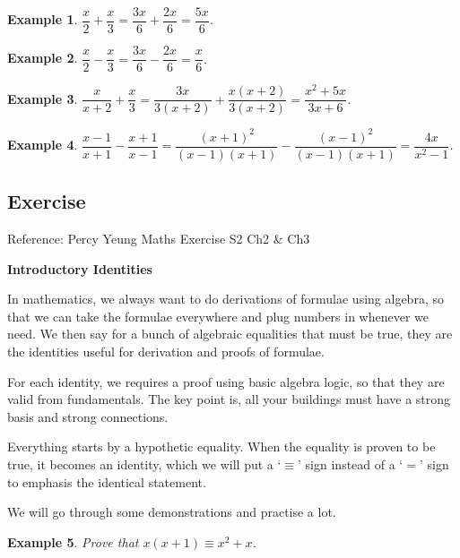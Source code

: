 \documentclass[12pt]{article}
\newtheorem{example}{Example}
\begin{document}
    \begin{example}
        $\dfrac{x}{2}+\dfrac{x}{3}=\dfrac{3x}{6}+\dfrac{2x}{6}=\dfrac{5x}{6}$.
    \end{example}

    \begin{example}
        $\dfrac{x}{2}-\dfrac{x}{3}=\dfrac{3x}{6}-\dfrac{2x}{6}=\dfrac{x}{6}$.
    \end{example}

    \begin{example}
        $\dfrac{x}{x+2}+\dfrac{x}{3}=\dfrac{3x}{3(x+2)}+\dfrac{x(x+2)}{3(x+2)}=\dfrac{x^2+5x}{3x+6}$.
    \end{example}

    \begin{example}
        $\dfrac{x-1}{x+1}-\dfrac{x+1}{x-1}=\dfrac{(x+1)^2}{(x-1)(x+1)}-\dfrac{(x-1)^2}{(x-1)(x+1)}=\dfrac{4x}{x^2-1}$.
    \end{example}

    \subsection*{Exercise}
    Reference: Percy Yeung Maths Exercise S2 Ch2 \& Ch3

    \begin{center}
        \textbf{Introductory Identities}
    \end{center}

    In mathematics, we always want to do derivations of formulae using algebra, so that we can take the formulae everywhere and plug numbers in whenever we need. We then say for a bunch of algebraic equalities that must be true, they are the identities useful for derivation and proofs of formulae.

    For each identity, we requires a proof using basic algebra logic, so that they are valid from fundamentals. The key point is, all your buildings must have a strong basis and strong connections.

    Everything starts by a hypothetic equality. When the equality is proven to be true, it becomes an identity, which we will put a `$\equiv$' sign instead of a `$=$' sign to emphasis the identical statement.

    We will go through some demonstrations and practise a lot.

    \begin{example}
        Prove that $x(x+1)\equiv x^2+x$.
    \end{example}
\end{document}
